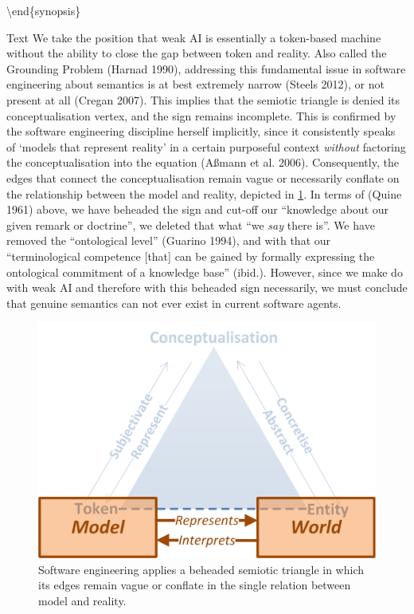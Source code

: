 \documentclass[a4paper,11pt,oneside,oldfontcommands]{memoir}
\theoremstyle{definition}
\theoremstyle{break}		%
\numberwithin{equation}{chapter}
\numberwithin{figure}{chapter}
\begin{document}
\textbackslash{}end\{synopsis\}

Text We take the position that weak AI is essentially a token-based
machine without the ability to close the gap between token and reality.
Also called the Grounding Problem (Harnad 1990), addressing this
fundamental issue in software engineering about semantics is at best
extremely narrow (Steels 2012), or not present at all (Cregan 2007).
This implies that the semiotic triangle is denied its conceptualisation
vertex, and the sign remains incomplete. This is confirmed by the
software engineering discipline herself implicitly, since it
consistently speaks of `models that represent reality' in a certain
purposeful context \emph{without} factoring the conceptualisation into
the equation (Aßmann et al. 2006). Consequently, the edges that connect
the conceptualisation remain vague or necessarily conflate on the
relationship between the model and reality, depicted in
\cref{fig:software-models-reality}. In terms of (Quine 1961) above, we
have beheaded the sign and cut-off our ``knowledge about our given
remark or doctrine'', we deleted that what ``we \emph{say} there is''.
We have removed the ``ontological level'' (Guarino 1994), and with that
our ``terminological competence {[}that{]} can be gained by formally
expressing the ontological commitment of a knowledge base'' (ibid.).
However, since we make do with weak AI and therefore with this beheaded
sign necessarily, we must conclude that genuine semantics can not ever
exist in current software agents.

\begin{figure}
\hypertarget{fig:software-models-reality}{%
\centering
\includegraphics{src/images/SoftwareModelsReality.png}
\caption{Software engineering applies a beheaded semiotic triangle in
which its edges remain vague or conflate in the single relation between
model and reality.}\label{fig:software-models-reality}
}
\end{figure}
\end{document}
